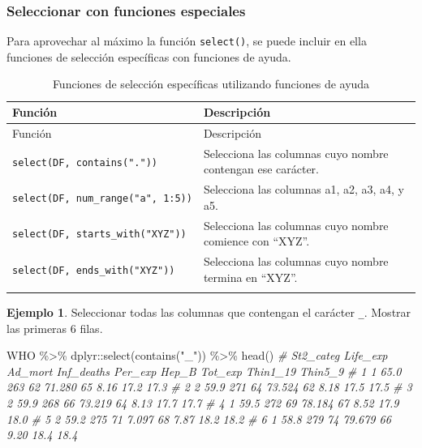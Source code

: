 \documentclass[
]{article}
\newenvironment{Shaded}{\begin{snugshade}}{\end{snugshade}}
\newcommand{\CommentTok}[1]{\textcolor[rgb]{0.56,0.35,0.01}{\textit{#1}}}
\newcommand{\FunctionTok}[1]{\textcolor[rgb]{0.00,0.00,0.00}{#1}}
\newcommand{\NormalTok}[1]{#1}
\newcommand{\SpecialCharTok}[1]{\textcolor[rgb]{0.00,0.00,0.00}{#1}}
\newcommand{\StringTok}[1]{\textcolor[rgb]{0.31,0.60,0.02}{#1}}
\theoremstyle{definition}
\theoremstyle{definition}
\newtheorem{example}{Ejemplo}[section]
\theoremstyle{definition}
\theoremstyle{definition}
\theoremstyle{remark}
\begin{document}
\hypertarget{seleccionar-con-funciones-especiales}{%
\subsubsection{Seleccionar con funciones especiales}\label{seleccionar-con-funciones-especiales}}

Para aprovechar al máximo la función \texttt{select()}, se puede incluir en ella funciones de selección específicas con funciones de ayuda.

\begin{longtable}[]{@{}ll@{}}
\caption{\label{tab:unnamed-chunk-29}Funciones de selección específicas utilizando funciones de ayuda}\tabularnewline
\toprule()
Función & Descripción \\
\midrule()
\endfirsthead
\toprule()
Función & Descripción \\
\midrule()
\endhead
\texttt{select(DF,\ contains("."))} & Selecciona las columnas cuyo nombre contengan ese carácter. \\
\texttt{select(DF,\ num\_range("a",\ 1:5))} & Selecciona las columnas a1, a2, a3, a4, y a5. \\
\texttt{select(DF,\ starts\_with("XYZ"))} & Selecciona las columnas cuyo nombre comience con ``XYZ''. \\
\texttt{select(DF,\ ends\_with("XYZ"))} & Selecciona las columnas cuyo nombre termina en ``XYZ''. \\
& \\
\bottomrule()
\end{longtable}

\begin{example}

Seleccionar todas las columnas que contengan el carácter \texttt{\_}. Mostrar las primeras 6 filas.

\begin{Shaded}
\begin{Highlighting}[]
\NormalTok{WHO }\SpecialCharTok{\%\textgreater{}\%} 
\NormalTok{  dplyr}\SpecialCharTok{::}\FunctionTok{select}\NormalTok{(}\FunctionTok{contains}\NormalTok{(}\StringTok{"\_"}\NormalTok{)) }\SpecialCharTok{\%\textgreater{}\%} 
  \FunctionTok{head}\NormalTok{()}
\CommentTok{\#   St2\_categ Life\_exp Ad\_mort Inf\_deaths Per\_exp Hep\_B Tot\_exp Thin1\_19 Thin5\_9}
\CommentTok{\# 1         1     65.0     263         62  71.280    65    8.16     17.2    17.3}
\CommentTok{\# 2         2     59.9     271         64  73.524    62    8.18     17.5    17.5}
\CommentTok{\# 3         2     59.9     268         66  73.219    64    8.13     17.7    17.7}
\CommentTok{\# 4         1     59.5     272         69  78.184    67    8.52     17.9    18.0}
\CommentTok{\# 5         2     59.2     275         71   7.097    68    7.87     18.2    18.2}
\CommentTok{\# 6         1     58.8     279         74  79.679    66    9.20     18.4    18.4}
\end{Highlighting}
\end{Shaded}

\end{example}
\end{document}

